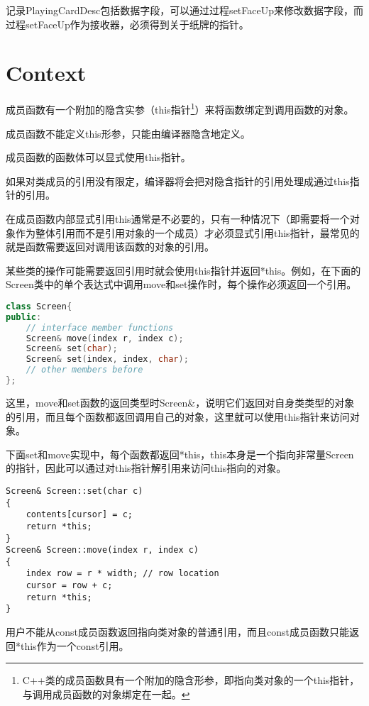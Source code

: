 记录PlayingCardDesc包括数据字段，可以通过过程setFaceUp来修改数据字段，而过程setFaceUp作为接收器，必须得到关于纸牌的指针。

\section{Context}


成员函数有一个附加的隐含实参（this指针\footnote{C++类的成员函数具有一个附加的隐含形参，即指向类对象的一个this指针，与调用成员函数的对象绑定在一起。}）来将函数绑定到调用函数的对象。

\begin{compactitem}
\item 成员函数不能定义this形参，只能由编译器隐含地定义。
\item 成员函数的函数体可以显式使用this指针。
\end{compactitem}

如果对类成员的引用没有限定，编译器将会把对隐含指针的引用处理成通过this指针的引用。

在成员函数内部显式引用this通常是不必要的，只有一种情况下（即需要将一个对象作为整体引用而不是引用对象的一个成员）才必须显式引用this指针，最常见的就是函数需要返回对调用该函数的对象的引用。

某些类的操作可能需要返回引用时就会使用this指针并返回*this。例如，在下面的Screen类中的单个表达式中调用move和set操作时，每个操作必须返回一个引用。

\begin{lstlisting}[language=C++]
class Screen{
public:
	// interface member functions
	Screen& move(index r, index c);
	Screen& set(char);
	Screen& set(index, index, char);
	// other members before
};
\end{lstlisting}

这里，move和set函数的返回类型时Screen\&，说明它们返回对自身类类型的对象的引用，而且每个函数都返回调用自己的对象，这里就可以使用this指针来访问对象。


下面set和move实现中，每个函数都返回*this，this本身是一个指向非常量Screen的指针，因此可以通过对this指针解引用来访问this指向的对象。

\begin{lstlisting}[language=Oberon-2]
Screen& Screen::set(char c)
{
	contents[cursor] = c;
	return *this;
}
Screen& Screen::move(index r, index c)
{
	index row = r * width; // row location
	cursor = row + c;
	return *this;
}
\end{lstlisting}

用户不能从const成员函数返回指向类对象的普通引用，而且const成员函数只能返回*this作为一个const引用。

